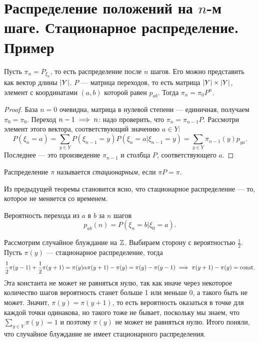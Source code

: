 \section{Распределение положений на $n$-м шаге. Стационарное распределение. Пример}

\begin{theorem}
    Пусть $\pi_n = P_{\xi_n}$, то есть распределение после $n$ шагов. Его можно представить как вектор
    длины $\lvert Y\rvert$. $P$ --- матрица переходов, то есть матрица $\lvert Y\rvert \times \lvert Y\rvert$, элемент с координатами $(a, b)$ которой равен $p_{ab}$. Тогда
    $\pi_n = \pi_0 P^n$.
\end{theorem}

\begin{proof}
    База $n=0$ очевидна, матрица в нулевой степени --- единичная, получаем $\pi_0 = \pi_0$.
    Переход $n - 1\implies n $: надо проверить, что $\pi_n = \pi_{n - 1}P$.
   Рассмотри элемент этого вектора, соответствующий значению $a \in Y$:
    $$P(\xi_n = a) = \underset{y\in Y}{\sum} P(\xi_{n - 1} = y)P(\xi_n = a | \xi_{n - 1} = y) = \underset{y\in Y}{\sum } \pi_{n - 1}(y) p_{ya}.$$
    Последнее --- это произведение $\pi_{n - 1}$ и столбца $P$, соответствующего $a$.
\end{proof}

\begin{definition}
   Распределение $\pi$ называется \textit{стационарным}, если $\pi P = \pi$.
\end{definition}

Из предыдущей теоремы становится ясно, что стационарное распределение --- то, которое не меняется со временем.

\begin{notation}
    Вероятность перехода из $a$ в $b$ за $n$ шагов 
   $$p_{ab}(n) = P(\xi_n = b | \xi_0 = a).$$
\end{notation}


\begin{example} Рассмотрим случайное блуждание на $\mathbb{Z}$.
    Выбираем сторону с вероятностью $\frac{1}{2}$. Пусть $\pi(y)$ --- стационарное распределение, тогда $$\frac{1}{2}\pi(y - 1) + \frac{1}{2}\pi(y+1) =
        \pi(y) \alpha \pi(y + 1) - \pi(y) = \pi(y) - \pi(y - 1)\implies \pi(y + 1) - \pi (y) = \mathrm{const}. $$
    Эта константа не может не равняться нулю, так как иначе через некоторое количество шагов вероятность станет больше 1 или меньше 0, а такого быть не может.
    Значит, $\pi(y) = \pi(y + 1)$, то есть вероятность оказаться в точке для каждой точки одинакова, но такого тоже не бывает, поскольку мы знаем,
    что $\sum_{y\in Y} \pi(y) = 1$ и поэтому $\pi(y)$ не может не равняться нулю.
    Итого поняли, что случайное блуждание не имеет стационарного распределения.
\end{example}\newpage
